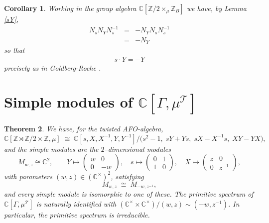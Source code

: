 \documentclass[11pt]{amsart}
\newtheorem{theorem}{Theorem}[section]
\newtheorem{corollary}[theorem]{Corollary}
\theoremstyle{remark}
\theoremstyle{definition}
\newcommand{\Z}{\mathbb{Z}}
\newcommand{\C}{\mathbb{C}}
\def\cT{\mathcal{T}}
\newcommand{\SL}{\mathrm{SL}}
\newcommand{\GL}{\mathrm{GL}}
\newcommand{\fs}{\mathfrak{s}}
\begin{document}
   \begin{corollary}  Working in the group algebra $\C[\Z/2 \times_\mu \Z_B]$ we have, by Lemma \ref{sY}, 
\begin{eqnarray*}
N_sN_YN_s^{-1} &= &- N_YN_sN_s^{-1}\\
&=& - N_Y 
\end{eqnarray*}
so that 
\begin{eqnarray}
s \cdot Y = - Y
\end{eqnarray}
precisely as in Goldberg-Roche \cite[\S11.8]{GR2}.
\end{corollary} 



\section{Simple modules of $\C[\Gamma, \mu^\cT]$}   
\begin{theorem}\label{thm:simples-expanded}
We have, for the twisted AFO-algebra,
\[
\C[\Z\rtimes\Z/2 \times \Z, \mu]
\;\cong\;
\C[s,X,X^{-1},Y,Y^{-1}]
\Big/\bigl(s^2-1,\; sY+Ys,\; sX-X^{-1}s,\; XY-YX\bigr),
\]
and the simple modules are the $2$--dimensional modules
\[
M_{w,z}\cong \C^2,\qquad
Y\mapsto\begin{pmatrix} w&0\\0&-w\end{pmatrix},\quad
s\mapsto\begin{pmatrix}0&1\\1&0\end{pmatrix},\quad
X\mapsto\begin{pmatrix} z&0\\0&z^{-1}\end{pmatrix},
\]
with parameters $(w,z)\in(\C^\times)^2$, satisfying
\[
M_{w,z}\;\cong\; M_{-w,z^{-1}},
\]
and every simple module is isomorphic to one of these.
The primitive spectrum of $\C[\Gamma, \mu^{\mathcal{T}}]$  is naturally identified with $(\C^\times \times \C^\times) / (w,z) \sim (-w, z^{-1})$.   
In particular, the primitive spectrum is irreducible.
\end{theorem}
\end{document}
